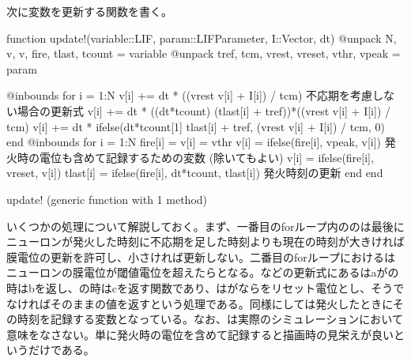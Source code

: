\documentclass[letterpaper,10pt,english]{sphinxmanual}
\begin{document}
次に変数を更新する関数を書く。

\begin{sphinxVerbatim}[commandchars=\\\{\}]
function update!(variable::LIF, param::LIFParameter, I::Vector, dt)
    @unpack N, v, v\PYGZus{}, fire, tlast, tcount = variable
    @unpack tref, tc\PYGZus{}m, vrest, vreset, vthr, vpeak = param
    
    @inbounds for i = 1:N
        \PYGZsh{}v[i] += dt * ((vrest \PYGZhy{} v[i] + I[i]) / tc\PYGZus{}m) \PYGZsh{} 不応期を考慮しない場合の更新式
        v[i] += dt * ((dt*tcount) \PYGZgt{} (tlast[i] + tref))*((vrest \PYGZhy{} v[i] + I[i]) / tc\PYGZus{}m)
        \PYGZsh{}v[i] += dt * ifelse(dt*tcount[1] \PYGZgt{} tlast[i] + tref, (vrest \PYGZhy{} v[i] + I[i]) / tc\PYGZus{}m, 0)
    end
    @inbounds for i = 1:N
        fire[i] = v[i] \PYGZgt{}= vthr
        v\PYGZus{}[i] = ifelse(fire[i], vpeak, v[i]) \PYGZsh{}発火時の電位も含めて記録するための変数 (除いてもよい)
        v[i] = ifelse(fire[i], vreset, v[i])        
        tlast[i] = ifelse(fire[i], dt*tcount, tlast[i]) \PYGZsh{} 発火時刻の更新
    end
end
\end{sphinxVerbatim}

\begin{sphinxVerbatim}[commandchars=\\\{\}]
update! (generic function with 1 method)
\end{sphinxVerbatim}

いくつかの処理について解説しておく。まず、一番目のforループ内ののは最後にニューロンが発火した時刻に不応期を足した時刻よりも現在の時刻が大きければ膜電位の更新を許可し、小さければ更新しない。二番目のforループにおけるはニューロンの膜電位が閾値電位を超えたらとなる。などの更新式にあるはaがの時はbを返し、の時はcを返す関数であり、はがならをリセット電位とし、そうでなければそのままの値を返すという処理である。同様にしては発火したときにその時刻を記録する変数となっている。なお、は実際のシミュレーションにおいて意味をなさない。単に発火時の電位を含めて記録すると描画時の見栄えが良いというだけである。
\end{document}
